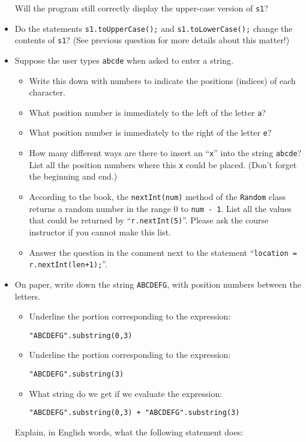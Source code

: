 \begin{itemize}
Will the program still correctly display the upper-case version of {\tt s1}?
\item
Do the statements {\tt s1.toUpperCase();} and {\tt s1.toLowerCase();}
change the contents of {\tt s1}? (See previous question for more details about this matter!)
\item
Suppose the user types {\tt abcde} when asked to enter a string.
\begin{itemize}
\item Write this down with numbers to indicate the positions (indices) of each character.
\item
What position number is immediately to the left of the letter {\tt a}?
\item
What position number is immediately to the right of the letter {\tt e}?
\item
How many different ways are there to insert an ``{\tt x}'' into the string
{\tt abcde}? List all the position numbers where this {\tt x} could be placed.
(Don't forget the beginning and end.)
\item
According to the book, the {\tt nextInt(num)} method of the {\tt Random}
class returns a random number in the range 0 to {\tt num - 1}.
List all the values that could be returned by ``{\tt r.nextInt(5)}''. Please ask the course instructor if you cannot
make this list.
\item
Answer the question in the comment next to the statement ``\verb$location = r.nextInt(len+1);$''.
\end{itemize}
\item
On paper, write down the string {\tt ABCDEFG}, with position numbers
between the letters.
\begin{itemize}
\item
Underline the portion corresponding to the
expression:
\begin{center}
\verb$"ABCDEFG".substring(0,3)$
\end{center}
\item
Underline the portion corresponding to the
expression:
\begin{center}
\verb$"ABCDEFG".substring(3)$
\end{center}
\item
What string do we get if we evaluate the expression:
\begin{center}
\verb$"ABCDEFG".substring(0,3) + "ABCDEFG".substring(3)$
\end{center}
\end{itemize}
Explain, in English words, what the following statement does:

\end{itemize}
